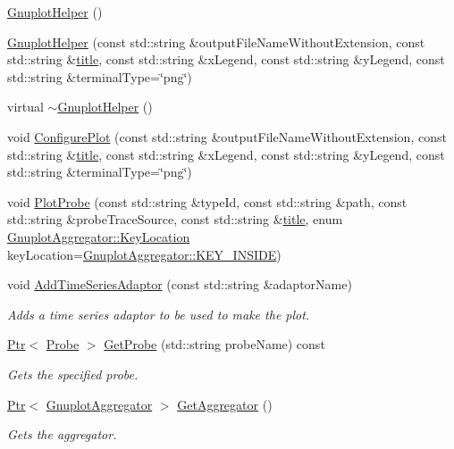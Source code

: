 \begin{DoxyCompactItemize}
\item 
\hyperlink{classns3_1_1GnuplotHelper_a33190d87db5758bd65c48f6ec19439c5}{Gnuplot\+Helper} ()
\item 
\hyperlink{classns3_1_1GnuplotHelper_a396b40634bedc93c7d7e7949f4e45b5d}{Gnuplot\+Helper} (const std\+::string \&output\+File\+Name\+Without\+Extension, const std\+::string \&\hyperlink{lte__link__budget__x2__handover__measures_8m_a3f4b991df405379f6917e1683ed5a8c8}{title}, const std\+::string \&x\+Legend, const std\+::string \&y\+Legend, const std\+::string \&terminal\+Type=\char`\"{}png\char`\"{})
\item 
virtual \hyperlink{classns3_1_1GnuplotHelper_abe34b2e8914428b57f5ea6ef4ab752d0}{$\sim$\+Gnuplot\+Helper} ()
\item 
void \hyperlink{classns3_1_1GnuplotHelper_a05a9beecc9f5ece76cda792daeea6fc3}{Configure\+Plot} (const std\+::string \&output\+File\+Name\+Without\+Extension, const std\+::string \&\hyperlink{lte__link__budget__x2__handover__measures_8m_a3f4b991df405379f6917e1683ed5a8c8}{title}, const std\+::string \&x\+Legend, const std\+::string \&y\+Legend, const std\+::string \&terminal\+Type=\char`\"{}png\char`\"{})
\item 
void \hyperlink{classns3_1_1GnuplotHelper_a755eeb654e6d2c3ab3ab9674e21480f9}{Plot\+Probe} (const std\+::string \&type\+Id, const std\+::string \&path, const std\+::string \&probe\+Trace\+Source, const std\+::string \&\hyperlink{lte__link__budget__x2__handover__measures_8m_a3f4b991df405379f6917e1683ed5a8c8}{title}, enum \hyperlink{classns3_1_1GnuplotAggregator_a84f2dafa52bb704042bc13c6cd6ee216}{Gnuplot\+Aggregator\+::\+Key\+Location} key\+Location=\hyperlink{classns3_1_1GnuplotAggregator_a84f2dafa52bb704042bc13c6cd6ee216a000db4d25c0c0a52bfc23225ad6ab0bb}{Gnuplot\+Aggregator\+::\+K\+E\+Y\+\_\+\+I\+N\+S\+I\+DE})
\item 
void \hyperlink{classns3_1_1GnuplotHelper_a3a2ff93dd86e62a0eaef53b559beccf4}{Add\+Time\+Series\+Adaptor} (const std\+::string \&adaptor\+Name)
\begin{DoxyCompactList}\small\item\em Adds a time series adaptor to be used to make the plot. \end{DoxyCompactList}\item 
\hyperlink{classns3_1_1Ptr}{Ptr}$<$ \hyperlink{classns3_1_1Probe}{Probe} $>$ \hyperlink{classns3_1_1GnuplotHelper_aa9cc4171046f7f95b58ed629cd2f37b7}{Get\+Probe} (std\+::string probe\+Name) const 
\begin{DoxyCompactList}\small\item\em Gets the specified probe. \end{DoxyCompactList}\item 
\hyperlink{classns3_1_1Ptr}{Ptr}$<$ \hyperlink{classns3_1_1GnuplotAggregator}{Gnuplot\+Aggregator} $>$ \hyperlink{classns3_1_1GnuplotHelper_af943d55cff587c86db18e813744be45c}{Get\+Aggregator} ()
\begin{DoxyCompactList}\small\item\em Gets the aggregator. \end{DoxyCompactList}\end{DoxyCompactItemize}
